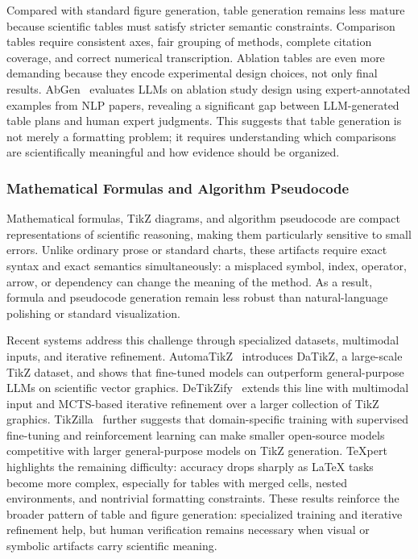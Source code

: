 \documentclass{llmxive}
\begin{document}
Compared with standard figure generation, table generation remains less mature because scientific tables must satisfy stricter semantic constraints. Comparison tables require consistent axes, fair grouping of methods, complete citation coverage, and correct numerical transcription. Ablation tables are even more demanding because they encode experimental design choices, not only final results. AbGen~\cite{abgen2025} evaluates LLMs on ablation study design using expert-annotated examples from NLP papers, revealing a significant gap between LLM-generated table plans and human expert judgments. This suggests that table generation is not merely a formatting problem; it requires understanding which comparisons are scientifically meaningful and how evidence should be organized.



\subsubsection{Mathematical Formulas and Algorithm Pseudocode}
\label{sec:formula_gen}

Mathematical formulas, TikZ diagrams, and algorithm pseudocode are compact representations of scientific reasoning, making them particularly sensitive to small errors. Unlike ordinary prose or standard charts, these artifacts require exact syntax and exact semantics simultaneously: a misplaced symbol, index, operator, arrow, or dependency can change the meaning of the method. As a result, formula and pseudocode generation remain less robust than natural-language polishing or standard visualization.

Recent systems address this challenge through specialized datasets, multimodal inputs, and iterative refinement. AutomaTikZ~\cite{belouadi2024automatikz} introduces DaTikZ, a large-scale TikZ dataset, and shows that fine-tuned models can outperform general-purpose LLMs on scientific vector graphics. DeTikZify~\cite{belouadi2024detikzify} extends this line with multimodal input and MCTS-based iterative refinement over a larger collection of TikZ graphics. TikZilla~\cite{tikzilla2026} further suggests that domain-specific training with supervised fine-tuning and reinforcement learning can make smaller open-source models competitive with larger general-purpose models on TikZ generation. TeXpert~\cite{texpert2025} highlights the remaining difficulty: accuracy drops sharply as LaTeX tasks become more complex, especially for tables with merged cells, nested environments, and nontrivial formatting constraints. These results reinforce the broader pattern of table and figure generation: specialized training and iterative refinement help, but human verification remains necessary when visual or symbolic artifacts carry scientific meaning.
\end{document}
